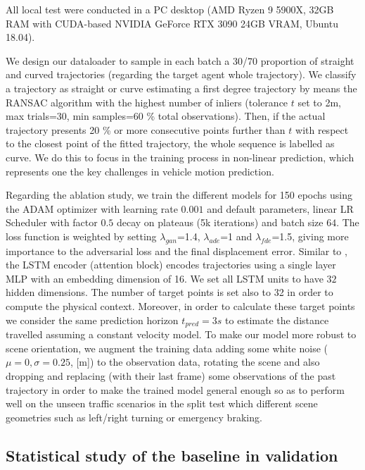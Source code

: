 All local test were conducted in a PC desktop (AMD Ryzen 9 5900X, 32GB RAM with CUDA-based NVIDIA GeForce RTX 3090 24GB VRAM, Ubuntu 18.04).

We design our dataloader to sample in each batch a 30/70 proportion of straight and curved trajectories (regarding the target agent whole trajectory). We classify a trajectory as straight or curve estimating a first degree trajectory by means the RANSAC algorithm with the highest number of inliers (tolerance $t$ set to 2m, max trials=30, min samples=60 \% total observations). Then, if the actual trajectory presents 20 \% or more consecutive points further than $t$ with respect to the closest point of the fitted trajectory, the whole sequence is labelled as curve. We do this to focus in the training process in non-linear prediction, which represents one the key challenges in vehicle motion prediction. 

Regarding the ablation study, we train the different models for 150 epochs using the ADAM optimizer with learning rate $0.001$ and default parameters, linear LR Scheduler with factor $0.5$ decay on plateaus (5k iterations) and batch size $64$. The loss function is weighted by setting $\lambda_{gan}$=1.4, $\lambda_{ade}$=1 and $\lambda_{fde}$=1.5, giving more importance to the adversarial loss and the final displacement error. Similar to \cite{sadeghian2019sophie}, the LSTM encoder (attention block) encodes trajectories using a single layer MLP with an embedding dimension of 16. We set all LSTM units to have $32$ hidden dimensions. The number of target points is set also to 32 in order to compute the physical context. Moreover, in order to calculate these target points we consider the same prediction horizon $t_{pred}=3s$ to estimate the distance travelled assuming a constant velocity model. To make our model more robust to scene orientation, we augment the training data adding some white noise ($\mu=0, \sigma=0.25$, [m]) to the observation data, rotating the scene and also dropping and replacing (with their last frame) some observations of the past trajectory in order to make the trained model general enough so as to perform well on the unseen traffic scenarios in the split test which different scene geometries such as left/right turning or emergency braking.%

\subsection{Statistical study of the baseline in validation}
\label{subsec:5_target_agent_distribution}

